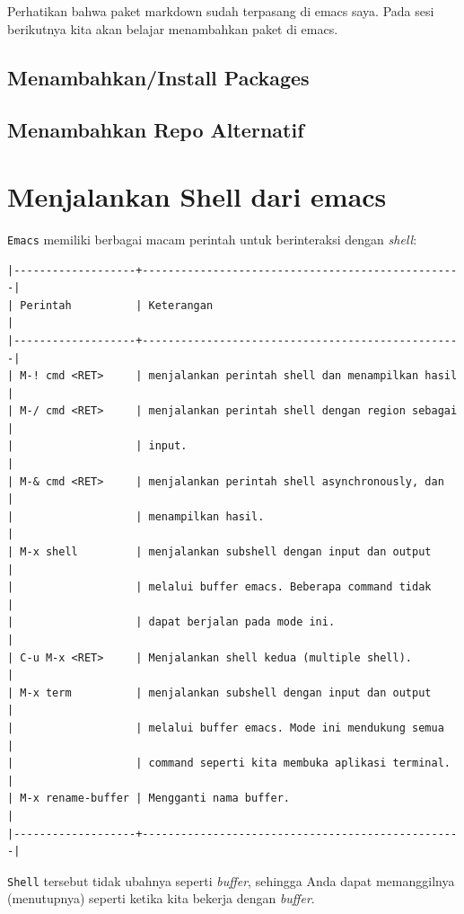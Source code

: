 \documentclass{article}
\begin{document}
\vspace{12pt}

Perhatikan bahwa paket markdown sudah terpasang di emacs saya. 
Pada sesi berikutnya kita akan belajar menambahkan paket di emacs.

\subsection{Menambahkan/Install Packages}
\subsection{Menambahkan Repo Alternatif}

\section{Menjalankan Shell dari emacs}
\verb=Emacs= memiliki berbagai macam perintah untuk berinteraksi dengan
\emph{shell}:

\begin{verbatim}
|-------------------+--------------------------------------------------|
| Perintah          | Keterangan                                       |
|-------------------+--------------------------------------------------|
| M-! cmd <RET>     | menjalankan perintah shell dan menampilkan hasil |
| M-/ cmd <RET>     | menjalankan perintah shell dengan region sebagai |
|                   | input.                                           |
| M-& cmd <RET>     | menjalankan perintah shell asynchronously, dan   |
|                   | menampilkan hasil.                               |
| M-x shell         | menjalankan subshell dengan input dan output     |
|                   | melalui buffer emacs. Beberapa command tidak     |
|                   | dapat berjalan pada mode ini.                    |
| C-u M-x <RET>     | Menjalankan shell kedua (multiple shell).        |
| M-x term          | menjalankan subshell dengan input dan output     |
|                   | melalui buffer emacs. Mode ini mendukung semua   |
|                   | command seperti kita membuka aplikasi terminal.  |
| M-x rename-buffer | Mengganti nama buffer.                           |
|-------------------+--------------------------------------------------|
\end{verbatim}

\verb=Shell= tersebut tidak ubahnya seperti \emph{buffer}, sehingga Anda dapat 
memanggilnya (menutupnya) seperti ketika kita bekerja dengan \emph{buffer}.
\end{document}
